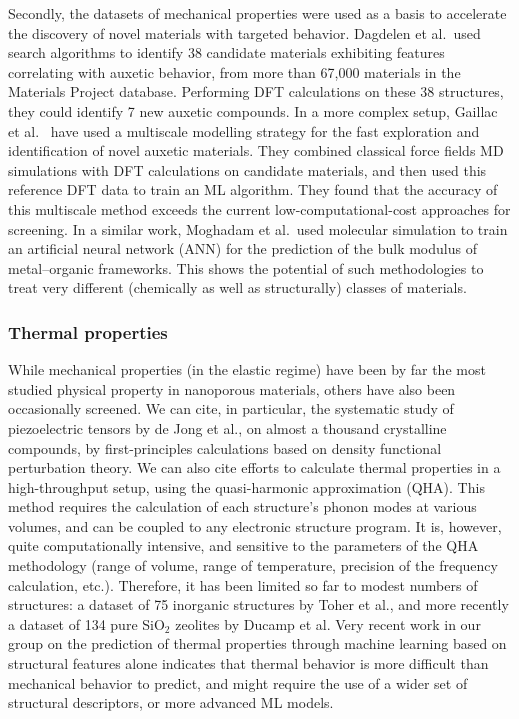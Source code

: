 \documentclass[main.tex]{subfiles}
\begin{document}
Secondly, the datasets of mechanical properties were used as a basis to accelerate the discovery of novel materials with targeted behavior. Dagdelen et al.\ used search algorithms to identify 38 candidate materials exhibiting features correlating with auxetic behavior, from more than 67,000 materials in the Materials Project database.\cite{Dagdelen_2017} Performing DFT calculations on these 38 structures, they could identify 7 new auxetic compounds. In a more complex setup, Gaillac et al.~\cite{Gaillac_2020} have used a multiscale modelling strategy for the fast exploration and identification of novel auxetic materials. They combined classical force fields MD simulations with DFT calculations on candidate materials, and then used this reference DFT data to train an ML algorithm. They found that the accuracy of this multiscale method exceeds the current low-computational-cost approaches for screening. In a similar work, Moghadam et al.\ used molecular simulation to train an artificial neural network (ANN) for the prediction of the bulk modulus of metal--organic frameworks.\cite{Moghadam_2019} This shows the potential of such methodologies to treat very different (chemically as well as structurally) classes of materials.

\subsubsection{Thermal properties}

While mechanical properties (in the elastic regime) have been by far the most studied physical property in nanoporous materials, others have also been occasionally screened. We can cite, in particular, the systematic study of piezoelectric tensors by de Jong et al., on almost a thousand crystalline compounds, by first-principles calculations based on density functional perturbation theory.\cite{deJong2015_piezo} We can also cite efforts to calculate thermal properties in a high-throughput setup, using the quasi-harmonic approximation (QHA).\cite{Togo_2010} This method requires the calculation of each structure's phonon modes at various volumes, and can be coupled to any electronic structure program.\cite{Togo_2015} It is, however, quite computationally intensive, and sensitive to the parameters of the QHA methodology (range of volume, range of temperature, precision of the frequency calculation, etc.). Therefore, it has been limited so far to modest numbers of structures: a dataset of 75 inorganic structures by Toher et al.,\cite{Toher_2014} and more recently a dataset of 134 pure SiO$_2$ zeolites by Ducamp et al.\cite{Ducamp_2021} {Very recent work in our group on the prediction of thermal properties through machine learning based on structural features alone indicates that thermal behavior is more difficult than mechanical behavior to predict, and might require the use of a wider set of structural descriptors, or more advanced ML models.\cite{Ducamp_2022}}
\end{document}
